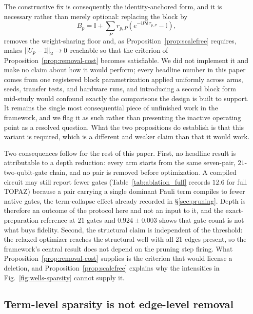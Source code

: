 \documentclass[twocolumn,aps,prl,superscriptaddress,showkeys]{revtex4-2}
\theoremstyle{plain}
\theoremstyle{definition}
\begin{document}
The constructive fix is consequently the identity-anchored form, and it is necessary rather than merely optional: replacing the block by
\begin{equation}
B_p=\mathbb{I}+\sum_P r_{p,P}\left(e^{-iP\,\delta\,\tau_{p,P}}-\mathbb{I}\right),
\label{eq:identity-anchored}
\end{equation}
removes the weight-sharing floor and, as Proposition~\ref{prop:scalefree} requires, makes $\norm{U_p-\mathbb{I}}_2\to0$ reachable so that the criterion of Proposition~\ref{prop:removal-cost} becomes satisfiable. We did not implement it and make no claim about how it would perform; every headline number in this paper comes from one registered block parametrization applied uniformly across arms, seeds, transfer tests, and hardware runs, and introducing a second block form mid-study would confound exactly the comparisons the design is built to support. It remains the single most consequential piece of unfinished work in the framework, and we flag it as such rather than presenting the inactive operating point as a resolved question. What the two propositions do establish is that this variant is required, which is a different and weaker claim than that it would work.

Two consequences follow for the rest of this paper. First, no headline result is attributable to a depth reduction: every arm starts from the same seven-pair, $21$-two-qubit-gate chain, and no pair is removed before optimization. A compiled circuit may still report fewer gates (Table~\ref{tab:ablation_full} records $12.6$ for full TOPAZ) because a pair carrying a single dominant Pauli term compiles to fewer native gates, the term-collapse effect already recorded in \S\ref{sec:pruning}. Depth is therefore an outcome of the protocol here and not an input to it, and the exact-preparation reference at $21$ gates and $0.924\pm0.003$ shows that gate count is not what buys fidelity. Second, the structural claim is independent of the threshold: the relaxed optimizer reaches the structural well with all 21 edges present, so the framework's central result does not depend on the pruning step firing. What Proposition~\ref{prop:removal-cost} supplies is the criterion that would license a deletion, and Proposition~\ref{prop:scalefree} explains why the intensities in Fig.~\ref{fig:wells-sparsity} cannot supply it.

\subsection{Term-level sparsity is not edge-level removal}
\end{document}
